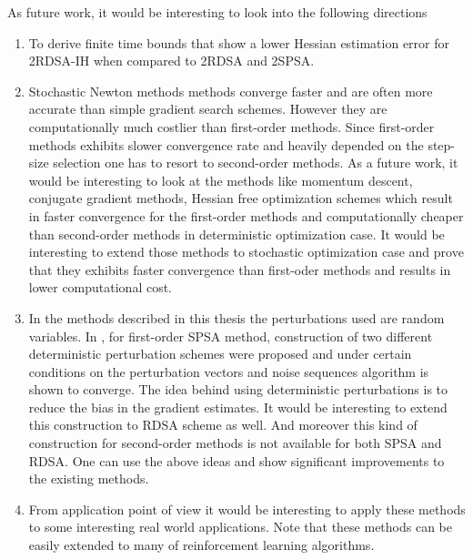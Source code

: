 As future work, it would be interesting to look into the following directions
\begin{enumerate}
\item To derive finite time bounds that show a lower Hessian estimation error for 2RDSA-IH when compared to 2RDSA and 2SPSA. 
\item Stochastic Newton methods  methods converge faster and  are often more accurate than simple gradient search schemes. However they are computationally much costlier than first-order methods. Since first-order methods exhibits slower convergence rate and heavily depended on the step-size selection one has to resort to second-order methods. As a future work, it would be interesting to look at the methods like momentum descent, conjugate gradient methods, Hessian free optimization schemes which result in faster convergence for the first-order methods and computationally cheaper than second-order methods in deterministic optimization case. It would be interesting to extend those methods to stochastic optimization case and prove that they exhibits  faster convergence than first-oder methods and results in lower computational cost. 
\item In the methods described in this thesis the perturbations used are random variables. In \cite{bhatnagar2003two}, for first-order SPSA method,  construction of two different deterministic  perturbation schemes were proposed and  under certain conditions on the perturbation vectors and noise sequences algorithm is shown to converge. The idea behind using deterministic perturbations is to reduce the bias in the gradient estimates. It would be interesting to extend this construction to RDSA scheme as well. And moreover this kind of construction for second-order methods is not available for both SPSA and RDSA. One can use the above ideas and show significant improvements to the existing methods.
\item From application point of view it would be interesting to apply these methods to some interesting real world applications. Note that these methods can be easily extended to many of reinforcement learning algorithms.
\end{enumerate}
